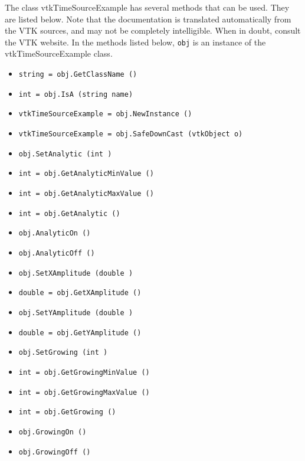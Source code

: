 The class vtkTimeSourceExample has several methods that can be used.
  They are listed below.
Note that the documentation is translated automatically from the VTK sources,
and may not be completely intelligible.  When in doubt, consult the VTK website.
In the methods listed below, \verb|obj| is an instance of the vtkTimeSourceExample class.
\begin{itemize}
\item  \verb|string = obj.GetClassName ()|

\item  \verb|int = obj.IsA (string name)|

\item  \verb|vtkTimeSourceExample = obj.NewInstance ()|

\item  \verb|vtkTimeSourceExample = obj.SafeDownCast (vtkObject o)|

\item  \verb|obj.SetAnalytic (int )|

\item  \verb|int = obj.GetAnalyticMinValue ()|

\item  \verb|int = obj.GetAnalyticMaxValue ()|

\item  \verb|int = obj.GetAnalytic ()|

\item  \verb|obj.AnalyticOn ()|

\item  \verb|obj.AnalyticOff ()|

\item  \verb|obj.SetXAmplitude (double )|

\item  \verb|double = obj.GetXAmplitude ()|

\item  \verb|obj.SetYAmplitude (double )|

\item  \verb|double = obj.GetYAmplitude ()|

\item  \verb|obj.SetGrowing (int )|

\item  \verb|int = obj.GetGrowingMinValue ()|

\item  \verb|int = obj.GetGrowingMaxValue ()|

\item  \verb|int = obj.GetGrowing ()|

\item  \verb|obj.GrowingOn ()|

\item  \verb|obj.GrowingOff ()|

\end{itemize}
